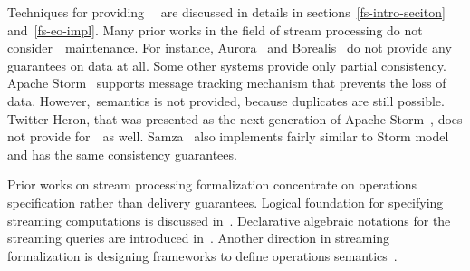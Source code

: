 
\label {fs-related-seciton}

Techniques for providing~\eo~\cite{Carbone:2017:SMA:3137765.3137777, Akidau:2013:MFS:2536222.2536229, Zaharia:2012:DSE:2342763.2342773} are discussed   in details in sections~\ref{fs-intro-seciton} and~\ref{fs-eo-impl}. Many prior works in the field of stream processing do not consider~\eo\ maintenance. 
For instance, Aurora~\cite{Abadi:2003:ANM:950481.950485} and Borealis~\cite{abadi2005design} do not provide any guarantees on data at all. Some other systems provide only partial consistency. Apache Storm~\cite{apache:storm} supports message tracking mechanism that prevents the loss of data. 
However,\eo\ semantics is not provided, because duplicates are still possible. Twitter Heron, that was presented as the next generation of Apache Storm~\cite{Kulkarni:2015:THS:2723372.2742788}, does not provide for~\eo\ as well. 
Samza~\cite{Noghabi:2017:SSS:3137765.3137770} also implements fairly similar to Storm model and has the same consistency guarantees.

Prior works on stream processing formalization concentrate on operations specification rather than delivery guarantees. Logical foundation for specifying streaming computations is discussed in~\cite{alur2018interfaces}. Declarative algebraic notations for the streaming queries are introduced in~\cite{halle2014formalization}. Another direction in streaming formalization is designing frameworks to define operations semantics~\cite{beck2018lars}.